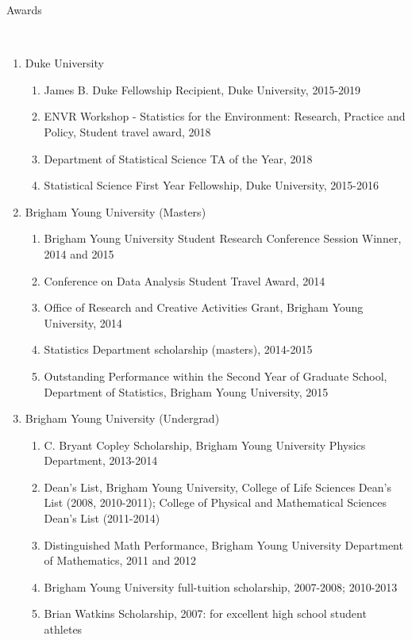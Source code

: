 \documentclass[11pt]{article}
\newcommand{\head}[1]{ %
    \bigskip %
    \begin{large}\begin{bf}{#1}\end{bf}\end{large} %

    \ \\ [-1.3cm] %

    \hrulefill}
\begin{document}
\head{Awards}
\begin{enumerate}[label=$\bullet$]
\item Duke University
\begin{enumerate}[label=$\cdot$]
\item James B. Duke Fellowship Recipient, Duke University, 2015-2019
\item ENVR Workshop - Statistics for the Environment: Research, Practice and Policy, Student travel award, 2018
\item Department of Statistical Science TA of the Year, 2018
\item Statistical Science First Year Fellowship, Duke University, 2015-2016
\end{enumerate}
\item Brigham Young University (Masters)
\begin{enumerate}[label=$\cdot$]
\item Brigham Young University Student Research Conference Session Winner, 2014 and 2015
\item Conference on Data Analysis Student Travel Award, 2014
\item Office of Research and Creative Activities Grant, Brigham Young University, 2014
\item Statistics Department scholarship (masters), 2014-2015
\item Outstanding Performance within the Second Year of Graduate School, Department of Statistics, Brigham Young University, 2015
\end{enumerate}
\item Brigham Young University (Undergrad)
\begin{enumerate}[label=$\cdot$]
\item C. Bryant Copley Scholarship, Brigham Young University Physics Department, 2013-2014
\item Dean's List, Brigham Young University, College of Life Sciences Dean's List (2008, 2010-2011); College of Physical and Mathematical Sciences Dean’s List (2011-2014)
\item Distinguished Math Performance, Brigham Young University Department of Mathematics, 2011 and 2012
\item Brigham Young University full-tuition scholarship, 2007-2008; 2010-2013 
\item Brian Watkins Scholarship, 2007: for excellent high school student athletes
\end{enumerate}

\end{enumerate}
\end{document}
